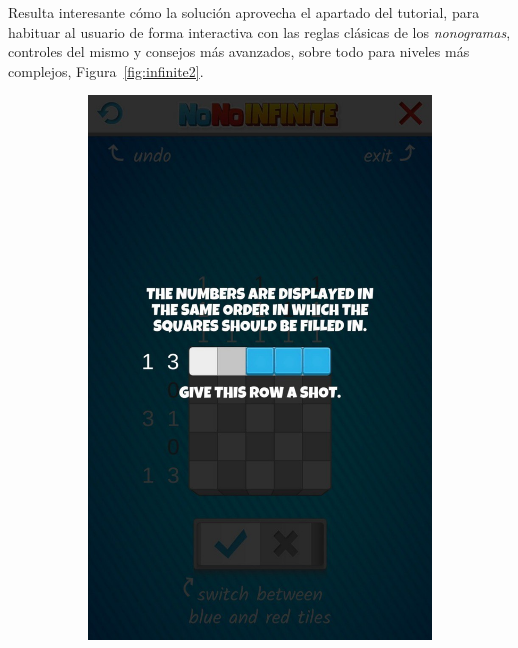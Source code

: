 Resulta interesante cómo la solución aprovecha el apartado del tutorial, para habituar al usuario de forma interactiva con las reglas clásicas de los 
\textit{nonogramas}, controles del mismo y consejos más avanzados, sobre todo para niveles más complejos, Figura~\ref{fig:infinite2}.

\begin{figure}[H]
   \centering
   \begin{subfigure}[b]{0.4\linewidth}
     \includegraphics[width=\linewidth]{images/infinite3.jpg}
   \end{subfigure}
   \begin{subfigure}[b]{0.4\linewidth}

\end{subfigure}
\end{figure}
